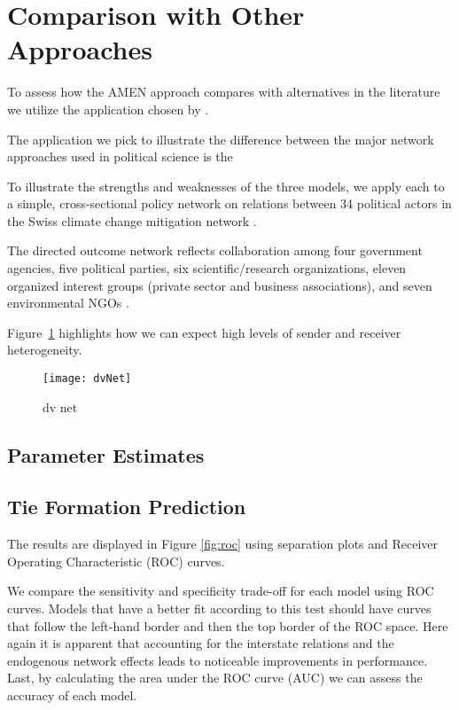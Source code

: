 \section{\textbf{Comparison with Other Approaches}}

To assess how the AMEN approach compares with alternatives in the literature we utilize the application chosen by \citet{cranmer:etal:2016}. 

The application we pick to illustrate the difference between the major network approaches used in political science is the 

To illustrate the strengths and weaknesses of the three models, we apply each to a simple, cross-sectional policy network on relations between 34 political actors in the Swiss climate change mitigation network \citep{ingold:2008}.

The directed outcome network reflects collaboration among four government agencies, five political parties, six scientific/research organizations, eleven organized interest groups (private sector and business associations), and seven environmental NGOs \citep{ingold:2008,ingold:fischer:2014}.

\citet{ingold:leifeld:2014}

Figure~\ref{fig:dvNet} highlights how we can expect high levels of sender and receiver heterogeneity. 

\begin{figure}[ht]
	\centering
	\texttt{[image: dvNet]}
	\caption{dv net}
	\label{fig:dvNet}
\end{figure}
\FloatBarrier

\citet{krivitsky:handcock:2015}

\subsection{Parameter Estimates}


\FloatBarrier

\subsection{Tie Formation Prediction}

The results are displayed in Figure \ref{fig:roc} using separation plots and Receiver Operating Characteristic (ROC) curves.

We compare the sensitivity and specificity trade-off for each model using ROC curves. Models that have a better fit according to this test should have curves that follow the left-hand border and then the top border of the ROC space. Here again it is apparent that accounting for the interstate relations and the endogenous network effects leads to noticeable improvements in performance. Last, by calculating the area under the ROC curve (AUC) we can assess the accuracy of each model.

